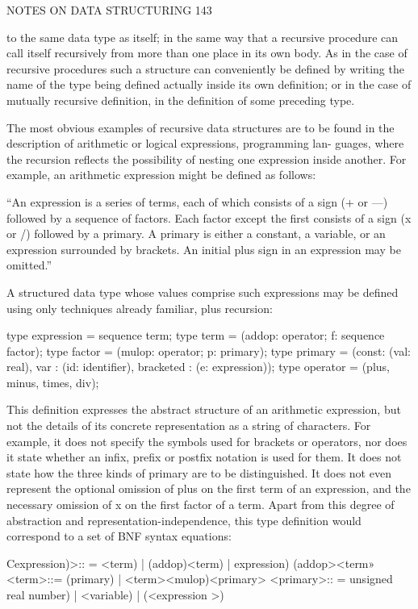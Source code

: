 {{{{				NOTES ON DATA STRUCTURING 143
				
				to the same data type as itself; in the same way that a recursive procedure can call itself recursively from more than one place in its own body. As in the case of recursive procedures such a structure can conveniently be defined by writing the name of the type being defined actually inside its own definition; or in the case of mutually recursive definition, in the definition of some preceding type.
				
				The most obvious examples of recursive data structures are to be found in the description of arithmetic or logical expressions, programming lan- guages, where the recursion reflects the possibility of nesting one expression inside another. For example, an arithmetic expression might be defined as follows:
				
				“An expression is a series of terms, each of which consists of a sign (+ or —) followed by a sequence of factors. Each factor except the first consists of a sign (x or /) followed by a primary. A primary is either a constant, a variable, or an expression surrounded by brackets. An initial plus sign in an expression may be omitted.”
				
				A structured data type whose values comprise such expressions may be defined using only techniques already familiar, plus recursion:
				
				type expression = sequence term; type term = (addop: operator; f: sequence factor); type factor = (mulop: operator; p: primary); type primary = (const: (val: real), var : (id: identifier), bracketed : (e: expression)); type operator = (plus, minus, times, div);
				
				This definition expresses the abstract structure of an arithmetic expression, but not the details of its concrete representation as a string of characters. For example, it does not specify the symbols used for brackets or operators, nor does it state whether an infix, prefix or postfix notation is used for them. It does not state how the three kinds of primary are to be distinguished. It does not even represent the optional omission of plus on the first term of an expression, and the necessary omission of x on the first factor of a term. Apart from this degree of abstraction and representation-independence, this type definition would correspond to a set of BNF syntax equations:
				
				Cexpression)>:: = <term) | (addop)<term) | expression) (addop><term» <term>::= (primary) | <term><mulop)<primary> <primary>:: = unsigned real number) | <variable) | (<expression >)
				
}}}}
